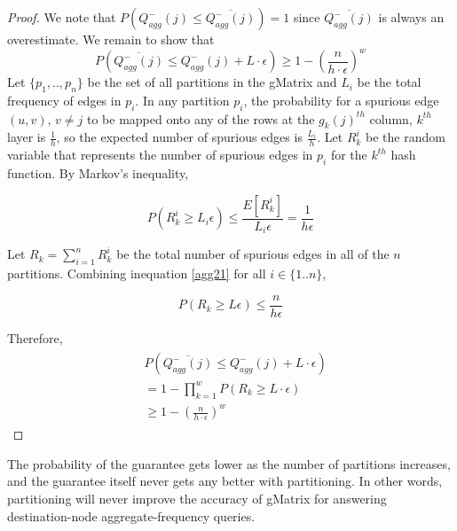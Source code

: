 \begin{proof}
We note that $P(Q_{agg}^{-}(j) \leq \overline{Q_{agg}^{-}(j)}) = 1$ since $\overline{Q_{agg}^{-}(j)}$ is always an overestimate. We remain to show that
\[
P(\overline{Q_{agg}^{-}(j)} \leq Q_{agg}^{-}(j) + L \cdot \epsilon) \geq 1-(\frac{n}{h\cdot\epsilon})^w
\]
Let $\{p_1,..,p_n\}$ be the set of all partitions in the gMatrix and $L_i$ be the total frequency of edges in $p_i$. In any partition $p_i$, the probability for a spurious edge $(u,v)$, $v \neq j$ to be mapped onto any of the rows at the $g_k(j)^{th}$ column, $k^{th}$ layer is $\frac{1}{h}$, so the expected number of spurious edges is $\frac{L_i}{h}$. Let $R_k^i$ be the random variable that represents the number of spurious edges in $p_i$ for the $k^{th}$ hash function. By Markov's inequality,

\begin{equation} \label{agg21}
  P(R_k^i \geq L_i \epsilon) \leq \frac{E[R_k^i]}{L_i \epsilon} = \frac{1}{h\epsilon}
\end{equation}

Let $R_k = \sum_{i=1}^{n} R_k^i$ be the total number of spurious edges in all of the $n$ partitions. Combining inequation \ref{agg21} for all $i \in \{1..n\}$, 

\begin{equation} \label{agg22}
 P(R_k \geq L\epsilon) \leq \frac{n}{h\epsilon}
\end{equation}

Therefore,
\begin{align}
\begin{split}
&  P(\overline{Q_{agg}^{-}(j)} \leq Q_{agg}^{-}(j) + L \cdot \epsilon)
\\  &= 1 - \prod _{k=1}^{w}P(R_k \geq L \cdot \epsilon)
\\  &\geq 1-(\frac{n}{h\cdot\epsilon})^w
\end{split}
\end{align}

\end{proof}

\begin{remarks}
The probability of the guarantee gets lower as the number of partitions increases, and the guarantee itself never gets any better with partitioning. In other words, partitioning will never improve the accuracy of gMatrix for answering destination-node aggregate-frequency queries.
\end{remarks}
